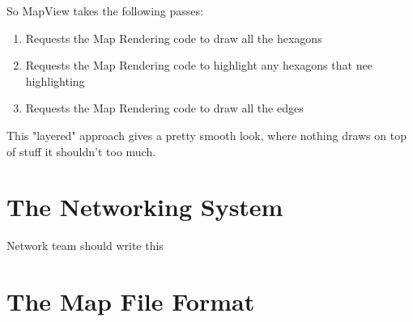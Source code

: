 \documentclass[12pt,a4paper]{article}
\begin{document}
So MapView takes the following passes:
\begin{enumerate}
\item{Requests the Map Rendering code to draw all the hexagons}
\item{Requests the Map Rendering code to highlight any hexagons that nee
      highlighting}
\item{Requests the Map Rendering code to draw all the edges}
\end{enumerate}

This "layered" approach gives a pretty smooth look, where nothing draws on top
of stuff it shouldn't too much.

\section{The Networking System}
Network team should write this

\section{The Map File Format}

\end{document}
